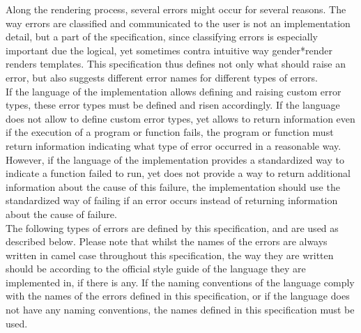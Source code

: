 \documentclass{article}
\newcommand{\GenderRender}{
    gender*render
}
\begin{document}
    Along the rendering process, several errors might occur for several reasons.
    The way errors are classified and communicated to the user is not an implementation detail, but a part of the specification, since classifying errors is especially important due the logical, yet sometimes contra intuitive way \GenderRender renders templates.
    This specification thus defines not only what should raise an error, but also suggests different error names for different types of errors.\\

    If the language of the implementation allows defining and raising custom error types, these error types must be defined and risen accordingly.
    If the language does not allow to define custom error types, yet allows to return information even if the execution of a program or function fails, the program or function must return information indicating what type of error occurred in a reasonable way.
    However, if the language of the implementation provides a standardized way to indicate a function failed to run, yet does not provide a way to return additional information about the cause of this failure, the implementation should use the standardized way of failing if an error occurs instead of returning information about the cause of failure.\\

    The following types of errors are defined by this specification, and are used as described below.
    Please note that whilst the names of the errors are always written in camel case throughout this specification, the way they are written should be according to the official style guide of the language they are implemented in, if there is any.
    If the naming conventions of the language comply with the names of the errors defined in this specification, or if the language does not have any naming conventions, the names defined in this specification must be used.
\end{document}

